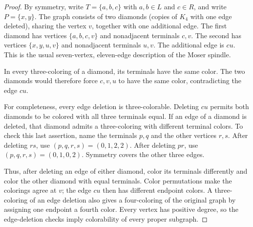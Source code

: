\documentclass[11pt]{article}
\begin{document}
\begin{proof}
By symmetry, write $T=\{a,b,c\}$ with $a,b\in L$ and $c\in R$,
and write $P=\{x,y\}$. The graph consists of two diamonds
(copies of $K_4$ with one edge deleted), sharing the vertex $v$,
together with one additional edge. The first diamond has
vertices $\{a,b,c,v\}$ and nonadjacent terminals $c,v$.
The second has vertices $\{x,y,u,v\}$ and nonadjacent terminals
$u,v$. The additional edge is $cu$. This is the usual
seven-vertex, eleven-edge description of the Moser spindle.

In every three-coloring of a diamond, its terminals have the
same color. The two diamonds would therefore force $c,v,u$
to have the same color, contradicting the edge $cu$.

For completeness, every edge deletion is three-colorable.
Deleting $cu$ permits both diamonds to be colored with all
three terminals equal. If an edge of a diamond is deleted,
that diamond admits a three-coloring with different terminal
colors. To check this last assertion, name the terminals $p,q$
and the other vertices $r,s$. After deleting $rs$, use
$(p,q,r,s)=(0,1,2,2)$. After deleting $pr$, use
$(p,q,r,s)=(0,1,0,2)$. Symmetry covers the other three edges.

Thus, after deleting an edge of either diamond, color its
terminals differently and color the other diamond with equal
terminals. Color permutations make the colorings agree at $v$;
the edge $cu$ then has different endpoint colors. A
three-coloring of an edge deletion also gives a four-coloring
of the original graph by assigning one endpoint a fourth color.
Every vertex has positive degree, so the edge-deletion checks
imply colorability of every proper subgraph.
\end{proof}
\end{document}

